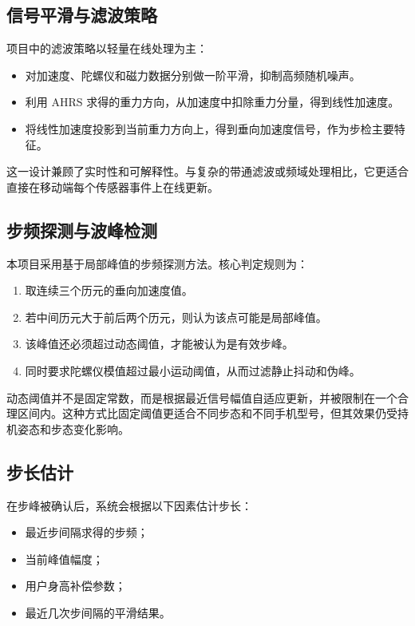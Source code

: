 \documentclass[12pt,a4paper]{ctexart}
\begin{document}
\subsection{信号平滑与滤波策略}
项目中的滤波策略以轻量在线处理为主：

\begin{itemize}
    \item 对加速度、陀螺仪和磁力数据分别做一阶平滑，抑制高频随机噪声。
    \item 利用 AHRS 求得的重力方向，从加速度中扣除重力分量，得到线性加速度。
    \item 将线性加速度投影到当前重力方向上，得到垂向加速度信号，作为步检主要特征。
\end{itemize}

这一设计兼顾了实时性和可解释性。与复杂的带通滤波或频域处理相比，它更适合直接在移动端每个传感器事件上在线更新。

\subsection{步频探测与波峰检测}
本项目采用基于局部峰值的步频探测方法。核心判定规则为：

\begin{enumerate}
    \item 取连续三个历元的垂向加速度值。
    \item 若中间历元大于前后两个历元，则认为该点可能是局部峰值。
    \item 该峰值还必须超过动态阈值，才能被认为是有效步峰。
    \item 同时要求陀螺仪模值超过最小运动阈值，从而过滤静止抖动和伪峰。
\end{enumerate}

动态阈值并不是固定常数，而是根据最近信号幅值自适应更新，并被限制在一个合理区间内。这种方式比固定阈值更适合不同步态和不同手机型号，但其效果仍受持机姿态和步态变化影响。

\subsection{步长估计}
在步峰被确认后，系统会根据以下因素估计步长：

\begin{itemize}
    \item 最近步间隔求得的步频；
    \item 当前峰值幅度；
    \item 用户身高补偿参数；
    \item 最近几次步间隔的平滑结果。
\end{itemize}
\end{document}
